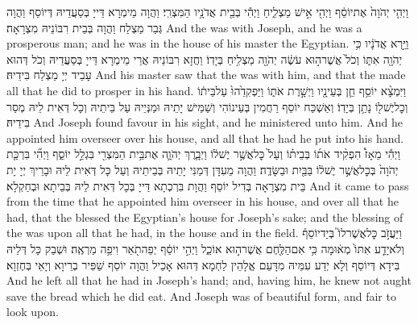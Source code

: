 {וַיְהִ֤י יְהֹוָה֙ אֶת\maqqaf יוֹסֵ֔ף וַיְהִ֖י אִ֣ישׁ מַצְלִ֑יחַ וַיְהִ֕י בְּבֵ֖ית אֲדֹנָ֥יו הַמִּצְרִֽי׃}
{וַהֲוָה מֵימְרָא דַּייָ בְּסַעֲדֵיהּ דְּיוֹסֵף וַהֲוָה גְּבַר מַצְלַח וַהֲוָה בְּבֵית רִבּוֹנֵיהּ מִצְרָאָה׃}
{And the \lord\space was with Joseph, and he was a prosperous man; and he was in the house of his master the Egyptian.}{}
{וַיַּ֣רְא אֲדֹנָ֔יו כִּ֥י יְהֹוָ֖ה אִתּ֑וֹ וְכֹל֙ אֲשֶׁר\maqqaf ה֣וּא עֹשֶׂ֔ה יְהֹוָ֖ה מַצְלִ֥יחַ בְּיָדֽוֹ׃}
{וַחֲזָא רִבּוֹנֵיהּ אֲרֵי מֵימְרָא דַּייָ בְּסַעֲדֵיהּ וְכֹל דְּהוּא עָבֵיד יְיָ מַצְלַח בִּידֵיהּ׃}
{And his master saw that the \lord\space was with him, and that the \lord\space made all that he did to prosper in his hand.}{}
{וַיִּמְצָ֨א יוֹסֵ֥ף חֵ֛ן בְּעֵינָ֖יו וַיְשָׁ֣רֶת אֹת֑וֹ וַיַּפְקִדֵ֙הוּ֙ עַל\maqqaf בֵּית֔וֹ וְכׇל\maqqaf יֶשׁ\maqqaf ל֖וֹ נָתַ֥ן בְּיָדֽוֹ׃}
{וְאַשְׁכַּח יוֹסֵף רַחֲמִין בְּעֵינוֹהִי וְשַׁמֵּישׁ יָתֵיהּ וּמַנְּיֵיהּ עַל בֵּיתֵיהּ וְכָל דְּאִית לֵיהּ מְסַר בִּידֵיהּ׃}
{And Joseph found favour in his sight, and he ministered unto him. And he appointed him overseer over his house, and all that he had he put into his hand.}{}
{וַיְהִ֡י מֵאָז֩ הִפְקִ֨יד אֹת֜וֹ בְּבֵית֗וֹ וְעַל֙ כׇּל\maqqaf אֲשֶׁ֣ר יֶשׁ\maqqaf ל֔וֹ וַיְבָ֧רֶךְ יְהֹוָ֛ה אֶת\maqqaf בֵּ֥ית הַמִּצְרִ֖י בִּגְלַ֣ל יוֹסֵ֑ף וַיְהִ֞י בִּרְכַּ֤ת יְהֹוָה֙ בְּכׇל\maqqaf אֲשֶׁ֣ר יֶשׁ\maqqaf ל֔וֹ בַּבַּ֖יִת וּבַשָּׂדֶֽה׃}
{וַהֲוָה מֵעִדָּן דְּמַנִּי יָתֵיהּ בְּבֵיתֵיהּ וְעַל כָּל דְּאִית לֵיהּ וּבָרֵיךְ יְיָ יָת בֵּית מִצְרָאָה בְּדִיל יוֹסֵף וַהֲוָת בִּרְכְתָא דַּייָ בְּכָל דְּאִית לֵיהּ בְּבֵיתָא וּבְחַקְלָא׃}
{And it came to pass from the time that he appointed him overseer in his house, and over all that he had, that the \lord\space blessed the Egyptian’s house for Joseph’s sake; and the blessing of the \lord\space was upon all that he had, in the house and in the field.}{}
{וַיַּעֲזֹ֣ב כׇּל\maqqaf אֲשֶׁר\maqqaf לוֹ֮ בְּיַד\maqqaf יוֹסֵף֒ וְלֹא\maqqaf יָדַ֤ע אִתּוֹ֙ מְא֔וּמָה כִּ֥י אִם\maqqaf הַלֶּ֖חֶם אֲשֶׁר\maqqaf ה֣וּא אוֹכֵ֑ל וַיְהִ֣י יוֹסֵ֔ף יְפֵה\maqqaf תֹ֖אַר וִיפֵ֥ה מַרְאֶֽה׃}
{וּשְׁבַק כָּל דְּלֵיהּ בִּידָא דְּיוֹסֵף וְלָא יְדַע עִמֵּיהּ מִדָּעַם אֱלָהֵין לַחְמָא דְּהוּא אָכֵיל וַהֲוָה יוֹסֵף שַׁפִּיר בְרֵיוָא וְיָאֵי בְּחֶזְוָא׃}
{And he left all that he had in Joseph’s hand; and, having him, he knew not aught save the bread which he did eat. And Joseph was of beautiful form, and fair to look upon.}{}
